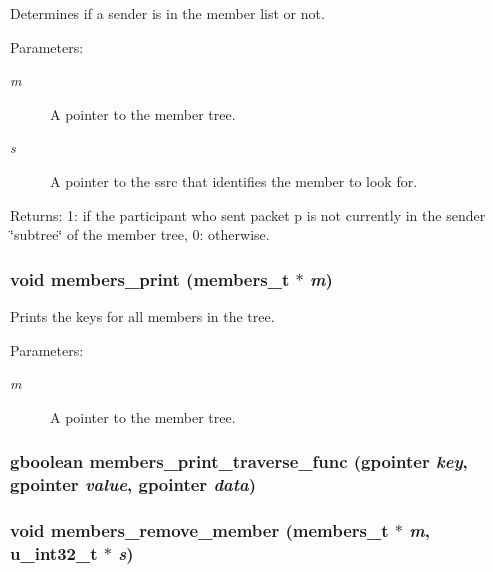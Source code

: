 Determines if a sender is in the member list or not. \begin{Desc}
\item[Parameters:]
\begin{description}
\item[{\em m}]A pointer to the member tree. \item[{\em s}]A pointer to the ssrc that identifies the member to look for. \end{description}
\end{Desc}
\begin{Desc}
\item[Returns:]1: if the participant who sent packet p is not currently in the sender \char`\"{}subtree\char`\"{} of the member tree, 0: otherwise. \end{Desc}
\subsubsection{\setlength{\rightskip}{0pt plus 5cm}void members\_\-print ({\bf members\_\-t} $\ast$ {\em m})}\label{members_8c_a15}


Prints the keys for all members in the tree. \begin{Desc}
\item[Parameters:]
\begin{description}
\item[{\em m}]A pointer to the member tree. \end{description}
\end{Desc}
\subsubsection{\setlength{\rightskip}{0pt plus 5cm}gboolean members\_\-print\_\-traverse\_\-func (gpointer {\em key}, gpointer {\em value}, gpointer {\em data})\hspace{0.3cm}{\tt  [static]}}\label{members_8c_a14}


\subsubsection{\setlength{\rightskip}{0pt plus 5cm}void members\_\-remove\_\-member ({\bf members\_\-t} $\ast$ {\em m}, u\_\-int32\_\-t $\ast$ {\em s})}\label{members_8c_a6}


